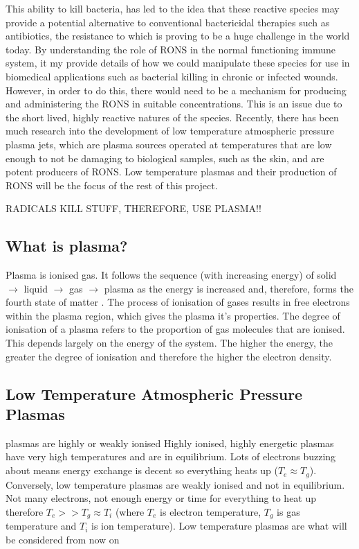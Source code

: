 \documentclass[11pt, oneside]{article}   	%
\begin{document}
This ability to kill bacteria, has led to the idea that these reactive species may provide a potential alternative to conventional bactericidal therapies such as antibiotics, the resistance to which is proving to be a huge challenge in the world today. 
By understanding the role of RONS in the normal functioning immune system, it my provide details of how we could manipulate these species for use in biomedical applications such as bacterial killing in chronic or infected wounds.
However, in order to do this, there would need to be a mechanism for producing and administering the RONS in suitable concentrations.
This is an issue due to the short lived, highly reactive natures of the species.
Recently, there has been much research into the development of low temperature atmospheric pressure plasma jets, which are plasma sources operated at temperatures that are low enough to not be damaging to biological samples, such as the skin, and are potent producers of RONS. 
Low temperature plasmas and their production of RONS will be the focus of the rest of this project.


RADICALS KILL STUFF, THEREFORE, USE PLASMA!!

\subsection{What is plasma?}
Plasma is ionised gas.
It follows the sequence (with increasing energy) of solid $\rightarrow$ liquid $\rightarrow$ gas $\rightarrow$ plasma as the energy is increased and, therefore, forms the fourth state of matter \cite{Fridman2013PlasmaMedicine}. 
The process of ionisation of gases results in free electrons within the plasma region, which gives the plasma it's properties.
The degree of ionisation of a plasma refers to the proportion of gas molecules that are ionised.
This depends largely on the energy of the system. 
The higher the energy, the greater the degree of ionisation and therefore the higher the electron density.

\subsection{Low Temperature Atmospheric Pressure Plasmas}

plasmas are highly or weakly ionised
Highly ionised, highly energetic plasmas have very high temperatures and are in equilibrium. Lots of electrons buzzing about means energy exchange is decent so everything heats up ($T_e \approx T_g$).
Conversely, low temperature plasmas are weakly ionised and not in equilibrium. Not many electrons, not enough energy or time for everything to heat up therefore $T_e >> T_g \approx T_i$ (where $T_e$ is electron temperature, $T_g$ is gas temperature and $T_i$ is ion temperature).
Low temperature plasmas are what will be considered from now on
\end{document}
